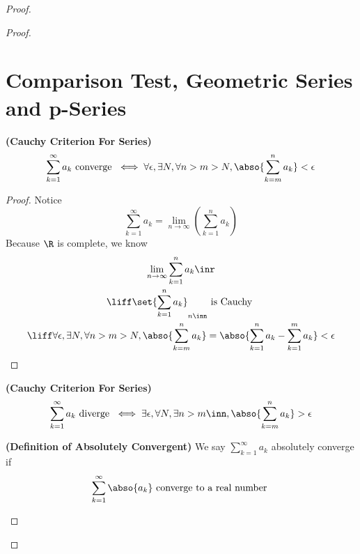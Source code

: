\documentclass{report}
\begin{document}
\begin{proof}
\begin{proof}
\section{Comparison Test, Geometric Series and p-Series}

\begin{theorem}
\label{4.3.1}
\textbf{(Cauchy Criterion For Series)} 
\begin{equation*}
  \sum_{k=1}^\infty a_k\text{ converge }\iff \forall \epsilon , \exists N, \forall n>m>N, \abso{\sum_{k=m}^n a_k}<\epsilon   
\end{equation*}
\end{theorem}
\begin{proof}
Notice 
\begin{equation*}
\sum_{k=1}^\infty a_k=\lim_{n\to\infty} (\sum_{k=1}^n a_k)
\end{equation*}
Because $\R$ is complete, we know  
 \begin{gather*}
\lim_{n\to\infty}\sum_{k=1}^n a_k\inr\\
\liff \set{\sum_{k=1}^n a_k}_{n\inn}\text{ is Cauchy }\\
\liff \forall \epsilon ,\exists N,\forall n>m>N, \abso{\sum_{k=m}^n a_k}=\abso{\sum_{k=1}^n a_k- \sum_{k=1}^m a_k}<\epsilon 
\end{gather*}
\end{proof}
\begin{corollary}
\label{4.3.2}
\textbf{(Cauchy Criterion For Series)} 
\begin{equation*}
  \sum_{k=1}^\infty a_k\text{ diverge }\iff \exists \epsilon, \forall N, \exists  n>m \inn, \abso{\sum_{k=m}^n a_k}>\epsilon 
\end{equation*}
\end{corollary}
\begin{definition}
\label{4.3.3}
\textbf{(Definition of Absolutely Convergent)} We say $\sum_{k=1}^\infty a_k$ absolutely converge if 
\begin{equation*}
 \sum_{k=1}^\infty \abso{a_k} \text{ converge to a real number }
\end{equation*}
\end{definition}
\begin{theorem}

\end{theorem}
\end{proof}
\end{proof}
\end{document}
